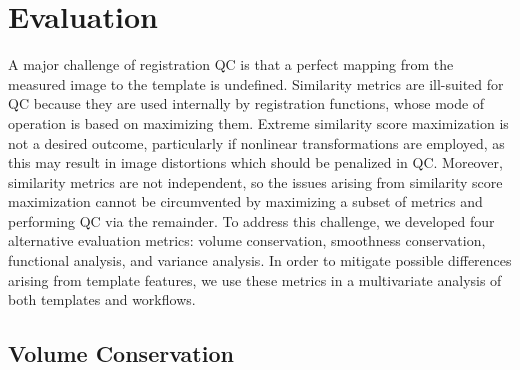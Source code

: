 \section{Evaluation}

A major challenge of registration QC is that a perfect mapping from the measured image to the template is undefined.
Similarity metrics are ill-suited for QC because they are used internally by registration functions, whose mode of operation is based on maximizing them.
Extreme similarity score maximization is not a desired outcome, particularly if nonlinear transformations are employed, as this may result in image distortions which should be penalized in QC.
Moreover, similarity metrics are not independent, so the issues arising from similarity score maximization cannot be circumvented by maximizing a subset of metrics and performing QC via the remainder.
To address this challenge, we developed four alternative evaluation metrics: volume conservation, smoothness conservation, functional analysis, and variance analysis.
In order to mitigate possible differences arising from template features, we use these metrics in a multivariate analysis of both templates and workflows.


\subsection{Volume Conservation}

